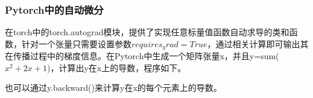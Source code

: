 \documentclass[cn,hazy,blue,14pt,screen]{elegantnote}
\begin{document}
\subsubsection{Pytorch中的自动微分}

在torch中的torch.autograd模块，提供了实现任意标量值函数自动求导的类和函数，针对一个张量只需要设置参数$requires_grad=True$，通过相关计算即可输出其在传播过程中的梯度信息。在Pytorch中生成一个矩阵张量x，并且y=sum($x^2+2x+1$)，计算出y在x上的导数，程序如下。

也可以通过y.backward()来计算y在x的每个元素上的导数。

\end{document}
